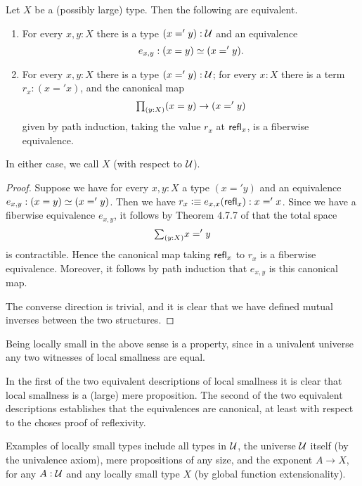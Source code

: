 \begin{lem}
Let $X$ be a (possibly large) type. Then the following are equivalent.
\begin{enumerate}
\item For every $x,y:X$ there is a type $(x='y):\mathcal{U}$ and an equivalence
\begin{equation*}
e_{x,y}:\eqv{(x=y)}{(x='y)}.
\end{equation*}
\item For every $x,y:X$ there is a type $(x='y):\mathcal{U}$; for every $x:X$ there
is a term $r_x : (x='x)$, and the canonical map
\begin{equation*}
\prd{y:X} (x=y)\to (x='y)
\end{equation*}
given by path induction, taking the value $r_x$ at $\mathsf{refl}_{x}$, is a fiberwise equivalence.
\end{enumerate}
In either case, we call $X$  (with respect to $\mathcal{U}$).
\end{lem}

\begin{proof}
Suppose we have for every $x,y:X$ a type $(x='y)$ and an equivalence $e_{x,y}:\eqv{(x=y)}{(x='y)}$. Then we have $r_x\vcentcolon\equiv e_{x,x}(\mathsf{refl}_{x}):x='x$. Since we have a fiberwise equivalence $e_{x,y}$, it follows by Theorem 4.7.7 of \cite{hottbook} that the total space
\begin{equation*}
\sm{y:X}x='y
\end{equation*}
is contractible. Hence the canonical map taking $\mathsf{refl}_{x}$ to $r_x$ is a fiberwise equivalence. Moreover, it follows by path induction that $e_{x,y}$ is this canonical map.

The converse direction is trivial, and it is clear that we have defined mutual inverses between the two structures.
\end{proof}

\begin{rmk}
Being locally small in the above sense is a property, since in a univalent universe
any two witnesses of local smallness are equal.

In the first of the two equivalent descriptions of local smallness it is clear that local smallness is a (large) mere proposition. The second of the two equivalent descriptions establishes that the equivalences are canonical, at least with respect to the choses proof of reflexivity.
\end{rmk}

\begin{eg}
Examples of locally small types include all types in $\mathcal{U}$, 
the universe $\mathcal{U}$ itself (by the univalence axiom), 
mere propositions of any size, 
and the exponent $A\to X$, for any $A:\mathcal{U}$ and any locally small type $X$
(by global function extensionality).
\end{eg}


